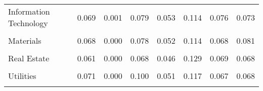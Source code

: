 \begin{table}[H]
\begin{tabular}{lccccccc}
Information Technology & 0.069 & 0.001 & 0.079 & 0.053 & 0.114 & 0.076 & 0.073 \\\\
Materials & 0.068 & 0.000 & 0.078 & 0.052 & 0.114 & 0.068 & 0.081 \\\\
Real Estate & 0.061 & 0.000 & 0.068 & 0.046 & 0.129 & 0.069 & 0.068 \\\\
Utilities & 0.071 & 0.000 & 0.100 & 0.051 & 0.117 & 0.067 & 0.068 \\\\
            \bottomrule
            \end{tabular}%
            \end{table}